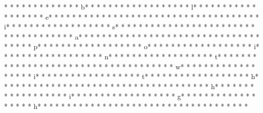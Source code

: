 *  * * *  *  * * *  *  * * *  * b* * *  * * *  * * *  *  * * *  *  * * *  * l* * *  * * *  * * *  *  * * *  *  * * *  * e* * *  * * *  * * *  *  * * *  *  * * *  *  * * *  * * *  * * *  *  * * *  *  * * *  * i* * *  * * *  * * *  *  * * *  *  * * *  * s* * *  * * *  * * *  *  * * *  *  * * *  *  * * *  * * *  * * *  *  * * *  *  * * *  * a* * *  * * *  * * *  *  * * *  *  * * *  *  * * *  * * *  * * *  *  * * *  *  * * *  * p* * *  * * *  * * *  *  * * *  *  * * *  * o* * *  * * *  * * *  *  * * *  *  * * *  * i* * *  * * *  * * *  *  * * *  *  * * *  * n* * *  * * *  * * *  *  * * *  *  * * *  * t* * *  * * *  * * *  *  * * *  *  * * *  *  * * *  * * *  * * *  *  * * *  *  * * *  * w* * *  * * *  * * *  *  * * *  *  * * *  * i* * *  * * *  * * *  *  * * *  *  * * *  * t* * *  * * *  * * *  *  * * *  *  * * *  * h* * *  * * *  * * *  *  * * *  *  * * *  *  * * *  * * *  * * *  *  * * *  *  * * *  * h* * *  * * *  * * *  *  * * *  *  * * *  * i* * *  * * *  * * *  *  * * *  *  * * *  * g* * *  * * *  * * *  *  * * *  *  * * *  * h* * *  * * *  * * *  *  * * *  *  * * *  *  * * *  * * *  * * *  *  * * *  *  * * *  * 
